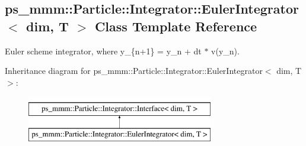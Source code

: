 \hypertarget{classps__mmm_1_1_particle_1_1_integrator_1_1_euler_integrator}{}\subsection{ps\+\_\+mmm\+:\+:Particle\+:\+:Integrator\+:\+:Euler\+Integrator$<$ dim, T $>$ Class Template Reference}
\label{classps__mmm_1_1_particle_1_1_integrator_1_1_euler_integrator}


Euler scheme integrator, where y\+\_\+\{n+1\} = y\+\_\+n + dt $\ast$ v(y\+\_\+n).  


Inheritance diagram for ps\+\_\+mmm\+:\+:Particle\+:\+:Integrator\+:\+:Euler\+Integrator$<$ dim, T $>$\+:\begin{figure}[H]
\begin{center}
\leavevmode
\includegraphics[height=2.000000cm]{classps__mmm_1_1_particle_1_1_integrator_1_1_euler_integrator}
\end{center}
\end{figure}
